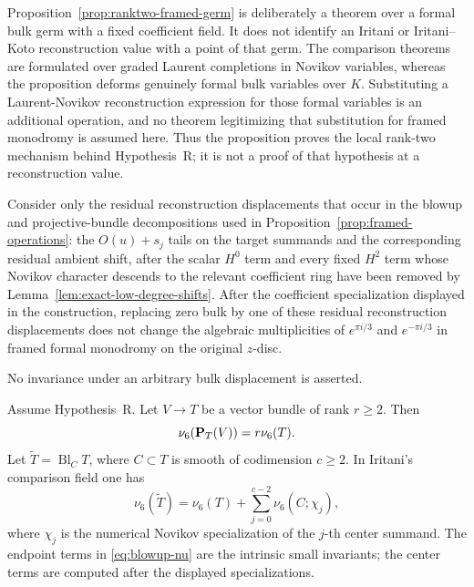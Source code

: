 \begin{remark}
\label{rem:ranktwo-germ-scope}
Proposition~\ref{prop:ranktwo-framed-germ} is deliberately a theorem over a
formal bulk germ with a fixed coefficient field.  It does not identify an
Iritani or Iritani--Koto reconstruction value with a point of that germ.
The comparison theorems are formulated over graded Laurent completions in
Novikov variables, whereas the proposition deforms genuinely formal bulk
variables over $K$.  Substituting a Laurent-Novikov reconstruction expression
for those formal variables is an additional operation, and no theorem
legitimizing that substitution for framed monodromy is assumed here.  Thus
the proposition proves the local rank-two mechanism behind
Hypothesis~R; it is not a proof of that hypothesis at a reconstruction
value.
\end{remark}

\begin{hypothesisR}
Consider only the residual reconstruction displacements that occur in the
blowup and projective-bundle decompositions used in
Proposition~\ref{prop:framed-operations}: the $O(u)+s_j$ tails on the target
summands and the corresponding residual ambient shift, after the scalar
$H^0$ term and every fixed $H^2$ term whose Novikov character descends to
the relevant coefficient ring have been removed by
Lemma~\ref{lem:exact-low-degree-shifts}.  After the coefficient
specialization displayed in the construction, replacing zero bulk by one of
these residual reconstruction displacements does not change the algebraic
multiplicities of $e^{\pi i/3}$ and $e^{-\pi i/3}$ in framed formal
monodromy on the original $z$-disc.

No invariance under an arbitrary bulk displacement is asserted.
\end{hypothesisR}



\begin{proposition}
\label{prop:framed-operations}
%
%
Assume Hypothesis~R.
Let \(V\to T\) be a vector bundle of rank \(r\ge2\).  Then
\[
 \nu_6(\mathbf P_T(V))=r\nu_6(T).
 \label{eq:projective-bundle-nu}
\]
Let \(\widetilde T=\operatorname{Bl}_C T\), where \(C\subset T\) is smooth of
codimension \(c\ge2\).  In Iritani's comparison field one has
\[
 \nu_6(\widetilde T)=\nu_6(T)+
 \sum_{j=0}^{c-2}\nu_6(C;\chi_j),
 \label{eq:blowup-nu}
\]
where \(\chi_j\) is the numerical Novikov specialization of the \(j\)-th
center summand.  The endpoint terms in \eqref{eq:blowup-nu} are the intrinsic small
invariants; the center terms are computed after the displayed specializations.
\end{proposition}

